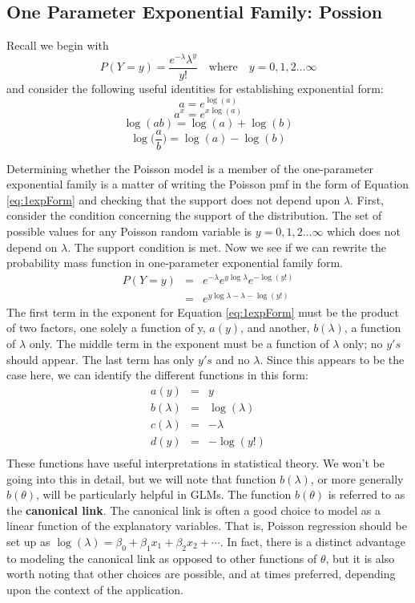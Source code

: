 \documentclass[
]{krantz}
\begin{document}
\hypertarget{one-parameter-exponential-family-possion}{%
\subsection{One Parameter Exponential Family: Possion}\label{one-parameter-exponential-family-possion}}

Recall we begin with
\[
P(Y=y)=\frac{e^{-\lambda}{\lambda}^y}{y!}\quad \textrm{where}\quad y=0,1,2\ldots\infty
\]
and consider the following useful identities for establishing exponential form:
\[a=e^{\log(a)} \]
\[a^x = e^{x\log(a)}\]
\[\log(ab)=\log(a)+\log(b)\]
\[\log\Big(\frac{a}{b}\Big)=\log(a)-\log(b)\]

Determining whether the Poisson model is a member of the one-parameter exponential family is a matter of writing the Poisson pmf in the form of Equation \eqref{eq:1expForm} and checking that the support does not depend upon \(\lambda\). First, consider the condition concerning the support of the distribution. The set of possible values for any Poisson random variable is \(y=0,1,2\ldots\infty\) which does not depend on \(\lambda\). The support condition is met. Now we see if we can rewrite the probability mass function in one-parameter exponential family form.
\begin{eqnarray}
 P(Y=y)&= &{e^{-\lambda}e^{y\log \lambda}e^{-\log (y!)}} \nonumber \\
       &= &e^{y\log \lambda-\lambda-\log (y!)}
 \label{eq:opeff}
 \end{eqnarray}
The first term in the exponent for Equation \eqref{eq:1expForm} must be the product of two factors, one solely a function of y, \(a(y)\), and another, \(b(\lambda)\), a function of \(\lambda\) only. The middle term in the exponent must be a function of \(\lambda\) only; no \(y's\) should appear. The last term has only \(y's\) and no \(\lambda\). Since this appears to be the case here, we can identify the different functions in this form:
\begin{eqnarray}
a(y)&=&y \\
b(\lambda)&=&\log(\lambda) \\
c(\lambda)&=&-\lambda \nonumber \\
d(y)&=&-\log (y!) \\
\label{eq:diffunc}
\end{eqnarray}
These functions have useful interpretations in statistical theory. We won't be going into this in detail, but we will note that function \(b(\lambda)\), or more generally \(b(\theta)\), will be particularly helpful in GLMs. The function \(b(\theta)\) is referred to as the \textbf{canonical link}. The canonical link is often a good choice to model as a linear function of the explanatory variables. That is, Poisson regression should be set up as \(\log(\lambda)=\beta_0+\beta_1x_1+\beta_2x_2+\cdots\). In fact, there is a distinct advantage to modeling the canonical link as opposed to other functions of \(\theta\), but it is also worth noting that other choices are possible, and at times preferred, depending upon the context of the application.
\end{document}
